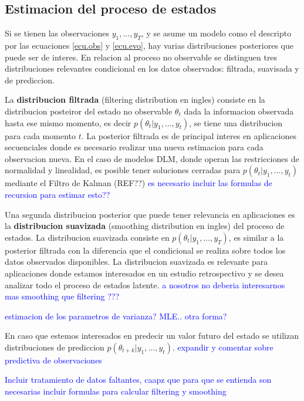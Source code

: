 \documentclass[12pt]{article}\usepackage[]{graphicx}\usepackage[]{color}
\begin{document}
\subsection{Estimacion del proceso de estados}

Si se tienen las observaciones $y_1,\dots,y_T$, y se asume un modelo como el descripto por las ecuaciones \eqref{ecu.obs} y \eqref{ecu.evo}, hay varias distribuciones posteriores que puede ser de interes. En relacion al proceso no observable se distinguen tres distribuciones relevantes condicional en los datos observados: filtrada, suavisada y de prediccion. 

La \textbf{distribucion filtrada} (filtering distribution en ingles) consiste en la distribucion posteiror del estado no observable $\theta_t$ dada la informacion observada hasta ese mismo momento, es decir $p(\theta_t | y_1, \ldots, y_t)$, se tiene una distribucion para cada momento $t$. La posterior filtrada es de principal interes en aplicaciones secuenciales donde es necesario realizar una nueva estimacion para cada observacion nueva. En el caso de modelos DLM, donde operan las restricciones de normalidad y linealidad, es posible tener soluciones cerradas para $p(\theta_t | y_1, \ldots, y_t)$ mediante el Filtro de Kalman (REF??) \textcolor{blue}{es necesario incluir las formulas de recursion para estimar esto??}

Una segunda distribucion posterior que puede tener relevancia en aplicaciones es la \textbf{distribucion suavizada} (smoothing distribution en ingles) del proceso de estados. La distribucion suavizada consiste en $p(\theta_t | y_1, \ldots, y_T)$, es similar a la posterior filtrada con la diferencia que el condicional se realiza sobre todos los datos observados disponibles. La distribucion suavizada es relevante para aplicaciones donde estamos interesados en un estudio retrospectivo y se desea analizar todo el proceso de estados latente. \textcolor{blue}{a nosotros no deberia interesarnos mas smoothing que filtering ???}

\textcolor{blue}{estimacion de los parametros de varianza? MLE.. otra forma?}

En caso que estemos interesados en predecir un valor futuro del estado se utilizan distribuciones de prediccion $p(\theta_{t+k} | y_1, \ldots, y_t)$. \textcolor{blue}{expandir y comentar sobre predictiva de observaciones}

\textcolor{blue}{Incluir tratamiento de datos faltantes, caapz que para que se entienda son necesarias incluir formulas para calcular filtering y smoothing}
\end{document}
